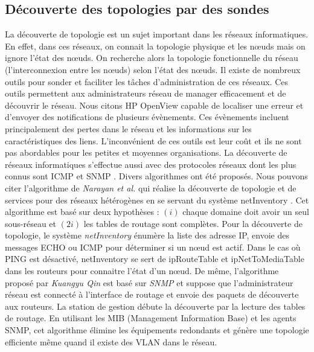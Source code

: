\subsection{D\'ecouverte des topologies par des sondes}
La d\'ecouverte de topologie est un sujet important dans les r\'eseaux informatiques.
En effet, dans ces r\'eseaux,  on connait la topologie physique et les n\oe uds mais on ignore l'\'etat des n\oe uds. On recherche alors la topologie fonctionnelle du r\'eseau (l'interconnexion entre les n\oe uds) selon l'\'etat des n\oe uds. 
Il existe de nombreux outils pour sonder et faciliter les t\^aches d'administration de ces r\'eseaux. 
Ces outils permettent aux administrateurs r\'eseau de manager efficacement et de d\'ecouvrir le r\'eseau.
Nous citons HP OpenView \cite{OpenView} capable de localiser une erreur et d'envoyer des notifications de plusieurs \'ev\`enements. Ces \'ev\`enements incluent principalement des pertes dans le r\'eseau et les informations sur les caract\'eristiques des liens.
L'inconv\'enient de ces outils est leur co\^ut et ils ne sont pas abordables pour les petites et moyennes organisations.
La d\'ecouverte de r\'eseaux informatiques s'effectue  aussi avec des protocoles r\'eseaux dont les plus connus sont ICMP \cite{rfc792} et SNMP \cite{rfc2821}.
Divers algorithmes ont \'et\'e propos\'es. 
Nous pouvons citer l'algorithme de {\em Narayan et al.} \cite{Breitbart:2004:TDH:1008463.1008464} qui r\'ealise la d\'ecouverte de topologie et de services pour des r\'eseaux h\'et\'erog\`enes en se servant du syst\`eme netInventory \cite{breitbart2004topology}. 
Cet algorithme est bas\'e sur deux hypoth\`eses : 
$(i)$ chaque domaine doit avoir un seul sous-r\'eseau et 
$(2i)$ les tables de routage sont compl\`etes. 
Pour la d\'ecouverte de topologie, le syst\`eme {\em netInventory} \'enum\`ere la liste des adresse IP, envoie des messages ECHO ou ICMP pour d\'eterminer si un n\oe ud est actif. Dans le cas o\`u PING est d\'esactiv\'e, netInventory se sert de ipRouteTable et ipNetToMediaTable dans les routeurs pour connaitre l'\'etat d'un n\oe ud.
\newline
De m\^eme, l'algorithme propos\'e par {\em Kuangyu Qin} \cite{QinKuangyuChunquan2010} est bas\'e sur {\em SNMP} et suppose que l'administrateur r\'eseau est connect\'e \`a l'interface de routage et envoie des paquets de d\'ecouverte aux routeurs. La station de gestion d\'ebute la d\'ecouverte par la lecture des tables de routage. En utilisant les MIB (Management Information Base) et les agents SNMP, cet algorithme \'elimine les \'equipements redondants et g\'en\`ere une topologie efficiente m\^eme quand il existe des VLAN dans le r\'eseau.
